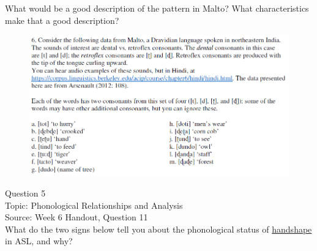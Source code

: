 \documentclass[12pt]{article}
\begin{document}
What would be a good description of the pattern in Malto? What characteristics make that a good description?\\

\begin{figure}[H]
\includegraphics{../images/malto.png}
\end{figure}

\newpage

{\large Question 5}\\

Topic: Phonological Relationships and Analysis\\
Source: Week 6 Handout, Question 11\\

What do the two signs below tell you about the phonological status of \underline{handshape} in ASL, and why?\\
\end{document}
